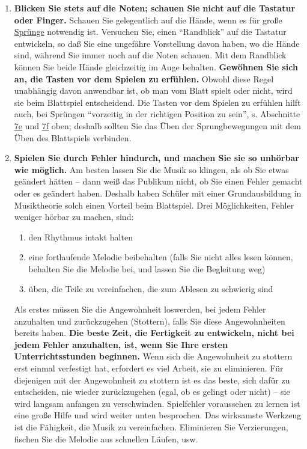 \begin{enumerate}[label={\arabic*.}] 
\item \textbf{Blicken Sie stets auf die Noten; schauen Sie nicht auf die Tastatur oder Finger.}
Schauen Sie gelegentlich auf die Hände, wenn es für große \hyperref[c1iii7f]{Sprünge} notwendig ist.
Versuchen Sie, einen \enquote{Randblick} auf die Tastatur entwickeln, so daß Sie eine ungefähre Vorstellung davon haben, wo die Hände sind, während Sie immer noch auf die Noten schauen.
Mit dem Randblick können Sie beide Hände gleichzeitig im Auge behalten.
\textbf{Gewöhnen Sie sich an, die Tasten vor dem Spielen zu erfühlen.}
Obwohl diese Regel unabhängig davon anwendbar ist, ob man vom Blatt spielt oder nicht, wird sie beim Blattspiel entscheidend.
Die Tasten vor dem Spielen zu erfühlen hilft auch, bei Sprüngen \enquote{vorzeitig in der richtigen Position zu sein}, s. Abschnitte \hyperref[c1iii7e]{7e} und \hyperref[c1iii7f]{7f} oben; deshalb sollten Sie das Üben der Sprungbewegungen mit dem Üben des Blattspiels verbinden.

\item \textbf{Spielen Sie durch Fehler hindurch, und machen Sie sie so unhörbar wie möglich.}
Am besten lassen Sie die Musik so klingen, als ob Sie etwas geändert hätten -- dann weiß das Publikum nicht, ob Sie einen Fehler gemacht oder es geändert haben.
Deshalb haben Schüler mit einer Grundausbildung in Musiktheorie solch einen Vorteil beim Blattspiel.
Drei Möglichkeiten, Fehler weniger hörbar zu machen, sind:

\begin{enumerate}[label={\roman*.}] 
\item den Rhythmus intakt halten
\item eine fortlaufende Melodie beibehalten (falls Sie nicht alles lesen können, behalten Sie die Melodie bei, und lassen Sie die Begleitung weg)
\item üben, die Teile zu vereinfachen, die zum Ablesen zu schwierig sind
\end{enumerate}

Als erstes müssen Sie die Angewohnheit loswerden, bei jedem Fehler anzuhalten und zurückzugehen (Stottern), falls Sie diese Angewohnheiten bereits haben.
\textbf{Die beste Zeit, die Fertigkeit zu entwickeln, nicht bei jedem Fehler anzuhalten, ist, wenn Sie Ihre ersten Unterrichtsstunden beginnen.}
Wenn sich die Angewohnheit zu stottern erst einmal verfestigt hat, erfordert es viel Arbeit, sie zu eliminieren.
Für diejenigen mit der Angewohnheit zu stottern ist es das beste, sich dafür zu entscheiden, nie wieder zurückzugehen (egal, ob es gelingt oder nicht) -- sie wird langsam anfangen zu verschwinden.
Spielfehler voraussehen zu lernen ist eine große Hilfe und wird weiter unten besprochen.
Das wirksamste Werkzeug ist die Fähigkeit, die Musik zu vereinfachen.
Eliminieren Sie Verzierungen, fischen Sie die Melodie aus schnellen Läufen, usw.


\end{enumerate}
